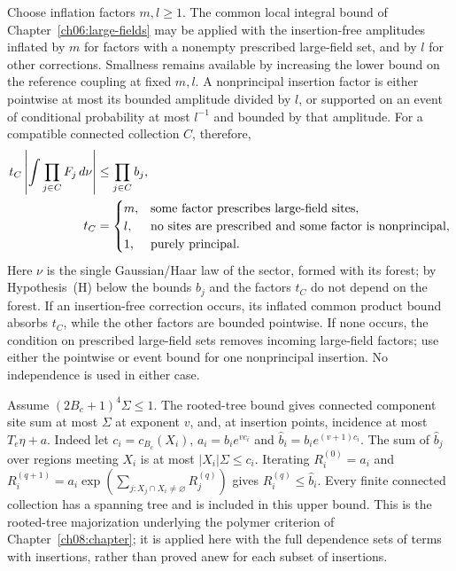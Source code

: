 Choose inflation factors $m,l\ge1$. The common local integral bound of
Chapter~\ref{ch06:large-fields} may be applied with the insertion-free
amplitudes inflated by $m$ for factors with a nonempty prescribed
large-field set, and by $l$ for other corrections. Smallness remains available
by increasing the lower bound on the reference coupling at fixed $m,l$.
A nonprincipal insertion factor is either pointwise at most its bounded
amplitude divided by $l$, or supported on an event of conditional
probability at most $l^{-1}$ and bounded by that amplitude.
For a compatible connected collection $C$, therefore,
\begin{align}
 t_C\left|\int\prod_{j\in C}F_j\,d\nu\right|
 &\le\prod_{j\in C}b_j,\notag\\
 t_C&=\begin{cases}
 m,&\text{some factor prescribes large-field sites},\\
 l,&\text{no sites are prescribed and some factor is nonprincipal},\\
 1,&\text{purely principal}.
 \end{cases}
 \label{ch11:integrated-component}
\end{align}
Here $\nu$ is the single Gaussian/Haar law of the sector, formed with its forest; by Hypothesis~(H) below the bounds $b_j$ and the factors $t_C$ do not depend on the forest.
If an insertion-free correction occurs, its inflated common product bound
absorbs $t_C$, while the other factors are bounded pointwise.
If none occurs, the condition on prescribed large-field sets removes incoming large-field
factors; use either the pointwise or event bound for one nonprincipal
insertion. No independence is used in either case.

Assume $(2B_c+1)^4\Sigma\le1$. The rooted-tree bound gives connected
component site sum at most $\Sigma$ at exponent $v$, and, at insertion points,
incidence at most $T_e\eta+a$. Indeed let
$c_i=c_{B_c}(X_i)$, $a_i=b_i e^{vc_i}$ and
$\widehat b_i=b_i e^{(v+1)c_i}$. The sum of $\widehat b_j$ over
regions meeting $X_i$ is at most $|X_i|\Sigma\le c_i$.
Iterating $R_i^{(0)}=a_i$ and
$R_i^{(q+1)}=a_i\exp(\sum_{j:X_j\cap X_i\ne\varnothing}R_j^{(q)})$
gives $R_i^{(q)}\le\widehat b_i$. Every finite connected collection
has a spanning tree and is included in this upper bound.
This is the rooted-tree majorization underlying the polymer criterion
of Chapter~\ref{ch08:chapter}; it is applied here with the full
dependence sets of terms with insertions, rather than proved anew for each subset of insertions.

